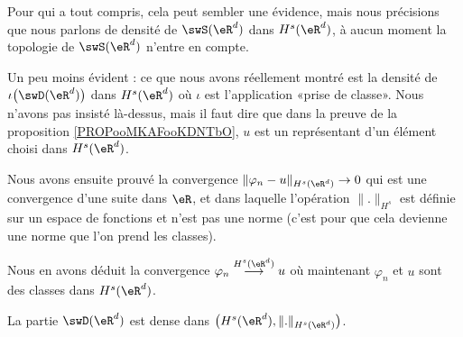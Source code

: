 \begin{remark}
    Pour qui a tout compris, cela peut sembler une évidence, mais nous précisions que nous parlons de densité de \( \swS(\eR^d)\) dans \( H^s(\eR^d)\), à aucun moment la topologie de \( \swS(\eR^d)\) n'entre en compte.

    Un peu moins évident : ce que nous avons réellement montré est la densité de \( \iota\big( \swD(\eR^d) \big)\) dans \( H^s(\eR^d)\) où \( \iota\) est l'application «prise de classe». Nous n'avons pas insisté là-dessus, mais il faut dire que dans la preuve de la proposition \ref{PROPooMKAFooKDNTbO}, \( u\) est un représentant d'un élément choisi dans \( H^s(\eR^d)\). 
    
    Nous avons ensuite prouvé la convergence \( \| \varphi_n-u \|_{H^s(\eR^d)}\to 0\) qui est une convergence d'une suite dans \( \eR\), et dans laquelle l'opération \( \| . \|_{H^s}\) est définie sur un espace de fonctions et n'est pas une norme (c'est pour que cela devienne une norme que l'on prend les classes).
    
    Nous en avons déduit la convergence \( \varphi_n\stackrel{H^s(\eR^d)}{\longrightarrow}u\) où maintenant \( \varphi_n\) et \( u\) sont des classes dans \( H^s(\eR^d)\).
\end{remark}

\begin{proposition}     \label{PROPooLIQJooKpWtnV}
    La partie \( \swD(\eR^d)\) est dense dans \( \big( H^s(\eR^d),\| . \|_{H^s(\eR^d)} \big)\).
\end{proposition}

